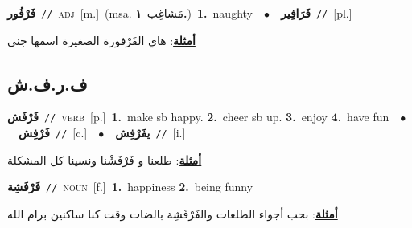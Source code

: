 \documentclass[10pt,a4paper,twoside]{article} %
\begin{document}
\begin{multicols}{2}
{\setlength\topsep{0pt}\textbf{\foreignlanguage{arabic}{فَرْفُور}}\ {\color{gray}\texttt{//}\color{black}}\ \textsc{adj}\ [m.]\ \color{gray}(msa. \foreignlanguage{arabic}{مَشاغِب}~\foreignlanguage{arabic}{\textbf{١.}})\color{black}\ \textbf{1.}~naughty\ \ $\bullet$\ \ \setlength\topsep{0pt}\textbf{\foreignlanguage{arabic}{فَرَافِير}}\ {\color{gray}\texttt{//}\color{black}}\ [pl.]\  \begin{flushright}\color{gray}\foreignlanguage{arabic}{\textbf{\underline{\foreignlanguage{arabic}{أمثلة}}}: هاي الفَرْفورة الصغيرة اسمها جنى}\end{flushright}\color{black}} \vspace{2mm}

\vspace{-3mm}
\subsection*{\color{blue}\foreignlanguage{arabic}{ف.ر.ف.ش}\color{blue}{}} 

{\setlength\topsep{0pt}\textbf{\foreignlanguage{arabic}{فَرْفَش}}\ {\color{gray}\texttt{//}\color{black}}\ \textsc{verb}\ [p.]\ \textbf{1.}~make sb happy.  \textbf{2.}~cheer sb up.  \textbf{3.}~enjoy  \textbf{4.}~have fun\ \ $\bullet$\ \ \setlength\topsep{0pt}\textbf{\foreignlanguage{arabic}{فَرْفِش}}\ {\color{gray}\texttt{//}\color{black}}\ [c.]\ \ $\bullet$\ \ \setlength\topsep{0pt}\textbf{\foreignlanguage{arabic}{يفَرْفِش}}\ {\color{gray}\texttt{//}\color{black}}\ [i.]\  \begin{flushright}\color{gray}\foreignlanguage{arabic}{\textbf{\underline{\foreignlanguage{arabic}{أمثلة}}}: طلعنا و فَرْفَشْنا ونسينا كل المشكلة}\end{flushright}\color{black}} \vspace{2mm}

{\setlength\topsep{0pt}\textbf{\foreignlanguage{arabic}{فَرْفَشِة}}\ {\color{gray}\texttt{//}\color{black}}\ \textsc{noun}\ [f.]\ \textbf{1.}~happiness  \textbf{2.}~being funny\  \begin{flushright}\color{gray}\foreignlanguage{arabic}{\textbf{\underline{\foreignlanguage{arabic}{أمثلة}}}: بحب أجواء الطلعات والفَرْفَشِة بالضات وقت كنا ساكنين برام الله}\end{flushright}\color{black}} \vspace{2mm}


\end{multicols}
\end{document}
